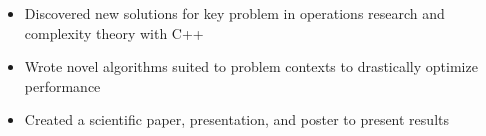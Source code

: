{
	\begin{itemize}
		\item Discovered new solutions for key problem in operations research and complexity theory with C++
		\item Wrote novel algorithms suited to problem contexts to drastically optimize performance
		\item Created a scientific paper, presentation, and poster to present results
	\end{itemize}
}
